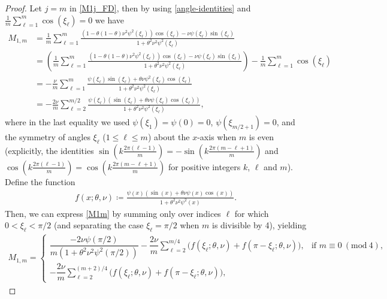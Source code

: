 \documentclass[smallextended,numbook,runningheads]{svjour3}     %
\newcommand{\Mod}[1]{\ (\mathrm{mod}\ #1)}
\begin{document}
\begin{description}[style=unboxed,leftmargin=0cm]
\begin{proof}
	Let $j = m$ in \eqref{M1j_FD}, then by using \eqref{angle-identities} and
	$\frac{1}{m}\sum_{\ell=1}^m \cos(\xi_\ell) = 0$ we have
	\begin{align}\label{M1m}
		M_{1,m} &= \frac{1}{m} \sum_{\ell=1}^{m} \frac{\left(1-\theta(1-\theta)\nu^2\psi^2(\xi_\ell)
					\right)\cos(\xi_\ell)-\nu\psi(\xi_\ell)\sin(\xi_\ell)}{1+\theta^2\nu^2\psi^2(\xi_\ell)} \nonumber \\
					&= \left(\frac{1}{m} \sum_{\ell=1}^{m} \frac{\left(1-\theta(1-\theta)\nu^2\psi^2(\xi_\ell)\right)
					\cos(\xi_\ell) - \nu\psi(\xi_\ell)\sin(\xi_\ell)}{1+\theta^2\nu^2\psi^2(\xi_\ell)}\right) -
					\frac{1}{m}\sum_{\ell=1}^m \cos(\xi_\ell) \nonumber \\
					&= -\frac{\nu}{m} \sum_{\ell=1}^{m} \frac{\psi(\xi_\ell)\sin(\xi_\ell)+\theta\nu\psi^2(\xi_\ell)
					\cos(\xi_\ell) }{1+\theta^2\nu^2\psi^2(\xi_\ell)} \nonumber \\
					&= -\frac{2\nu}{m} \sum_{\ell=2}^{m/2} \frac{\psi(\xi_\ell)(\sin(\xi_\ell)+\theta\nu\psi(\xi_\ell)
					\cos(\xi_\ell))}{1+\theta^2\nu^2\psi^2(\xi_\ell)},
	\end{align}
	where in the last equality we used $\psi(\xi_1) = \psi(0) = 0$,  $\psi(\xi_{m/2+1}) =  0$, and the symmetry
	of angles $\xi_\ell$ ($1 \le \ell \le m$) about the $x$-axis when $m$ is even (explicitly, the identities
	$\sin\left(k\frac{2\pi(\ell-1)}{m}\right)=-\sin\left(k\frac{2\pi(m-\ell+1)}{m}\right)$ and
	$\cos\left(k\frac{2\pi(\ell-1)}{m}\right)=\cos\left(k\frac{2\pi(m-\ell+1)}{m}\right)$ for positive integers
	$k$, $\ell$ and $m$).
	Define the function 
	\begin{align*}
		f(x; \theta, \nu) \coloneqq \frac{\psi(x)(\sin(x)+\theta\nu\psi(x)\cos(x))}{1+\theta^2\nu^2\psi^2(x)}.
	\end{align*}
	Then, we can express \eqref{M1m} by summing only over indices $\ell$ for which $0 < \xi_\ell  < \pi/2$ (and separating the case $\xi_\ell  = \pi/2$ when $m$ is divisible by 4),
	yielding
	\begin{align}\label{M1mnew}
		M_{1,m} = \begin{cases}
							\dfrac{-2\nu\psi(\pi/2)}{m\left(1+\theta^2\nu^2\psi^2(\pi/2)\right)} -
								\dfrac{2\nu}{m} \displaystyle{\sum\limits_{\ell=2}^{m/4}}
								\Big(f(\xi_\ell; \theta, \nu) + f(\pi-\xi_\ell; \theta, \nu) \Big),
								& \text{if } m \equiv 0 \Mod{4}, \\[20pt]
							-\dfrac{2\nu}{m} \displaystyle{\sum\limits_{\ell=2}^{(m+2)/4}}
								\Big(f(\xi_\ell; \theta, \nu) + f(\pi-\xi_\ell; \theta, \nu)\Big),

\end{cases}
\end{align}
\end{proof}
\end{description}
\end{document}

